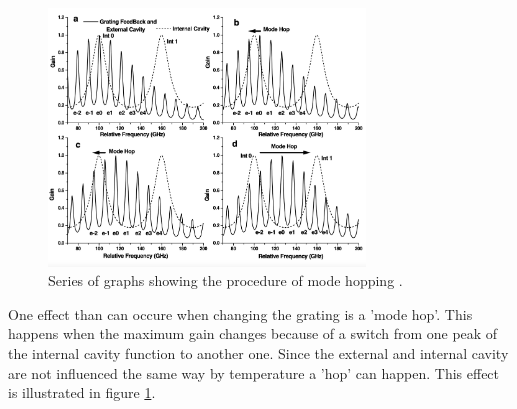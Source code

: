 \noindent

\begin{figure}
    \centering
    \includegraphics[width=0.75\textwidth]{modehops.png}
    \caption{Series of graphs showing the procedure of mode hopping \cite{V60}.}
    \label{fig:modehops}
  \end{figure}


\noindent
One effect than can occure when changing the grating is a 'mode hop'. This happens when the maximum gain changes because of a switch 
from one peak of the internal cavity function to another one. Since the external and internal cavity are not influenced 
the same way by temperature a 'hop' can happen. This effect is illustrated in figure \ref{fig:modehops}.




